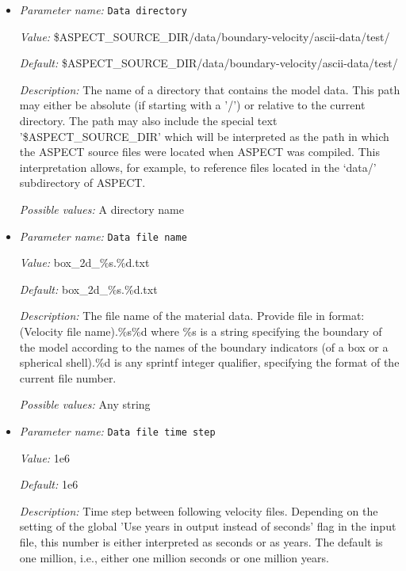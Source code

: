 \begin{itemize}
\item {\it Parameter name:} {\tt Data directory}
\label{parameters:Boundary velocity model/Ascii data model/Data directory}


{\it Value:} \$ASPECT\_SOURCE\_DIR/data/boundary-velocity/ascii-data/test/


{\it Default:} \$ASPECT\_SOURCE\_DIR/data/boundary-velocity/ascii-data/test/


{\it Description:} The name of a directory that contains the model data. This path may either be absolute (if starting with a '/') or relative to the current directory. The path may also include the special text '\$ASPECT\_SOURCE\_DIR' which will be interpreted as the path in which the ASPECT source files were located when ASPECT was compiled. This interpretation allows, for example, to reference files located in the `data/' subdirectory of ASPECT. 


{\it Possible values:} A directory name
\item {\it Parameter name:} {\tt Data file name}
\label{parameters:Boundary velocity model/Ascii data model/Data file name}


{\it Value:} box\_2d\_\%s.\%d.txt


{\it Default:} box\_2d\_\%s.\%d.txt


{\it Description:} The file name of the material data. Provide file in format: (Velocity file name).\%s\%d where \%s is a string specifying the boundary of the model according to the names of the boundary indicators (of a box or a spherical shell).\%d is any sprintf integer qualifier, specifying the format of the current file number. 


{\it Possible values:} Any string
\item {\it Parameter name:} {\tt Data file time step}
\label{parameters:Boundary velocity model/Ascii data model/Data file time step}


{\it Value:} 1e6


{\it Default:} 1e6


{\it Description:} Time step between following velocity files. Depending on the setting of the global 'Use years in output instead of seconds' flag in the input file, this number is either interpreted as seconds or as years. The default is one million, i.e., either one million seconds or one million years.



\end{itemize}

